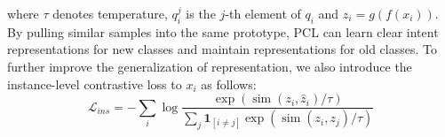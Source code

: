 \documentclass[11pt]{article}
\begin{document}
where $\tau$ denotes temperature, $q^j_{i}$ is the $j$-th element of $q_i$ and $z_i=g(f(x_i))$.
By pulling similar samples into the same prototype, PCL can learn clear intent representations for new classes and maintain representations for old classes.
To further improve the generalization of representation, we also introduce the instance-level contrastive loss \cite{chen2020simple} to $x_i$ as follows:
\begin{equation}
    \mathcal{L}_{ins}=-\sum_{i} \operatorname{log} \frac{\operatorname{exp}(\operatorname{sim}(z_i,\hat{z}_i)/\tau)}{\sum_j\mathbf{1}_{[i\neq j]}\operatorname{exp}(\operatorname{sim}(z_i,z_j)/\tau)}
\end{equation}
\end{document}
